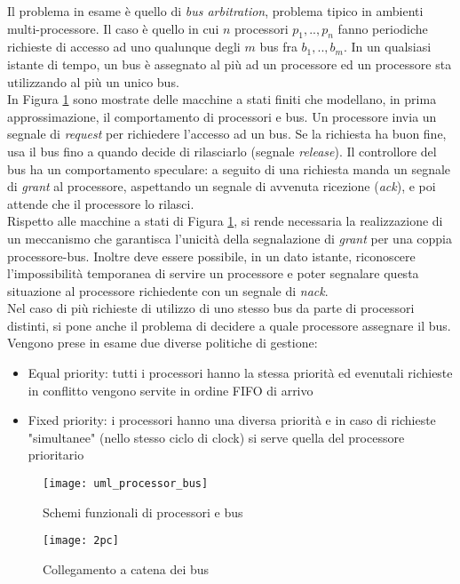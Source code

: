 Il problema in esame è quello di \textit{bus arbitration}, problema tipico in ambienti multi-processore. Il caso è quello in cui $n$ processori ${p_1,..,p_n}$  fanno periodiche richieste di accesso ad uno qualunque degli $m$ bus fra ${b_1,..,b_m}$. In un qualsiasi istante di tempo, un bus è assegnato al più ad un processore ed un processore sta utilizzando al più un unico bus.\\
In Figura \ref{Fig:uml} sono mostrate delle macchine a stati finiti che modellano, in prima approssimazione, il comportamento di processori e bus. Un processore invia un segnale di \textit{request} per richiedere l'accesso ad un bus. Se la richiesta ha buon fine, usa il bus fino a quando decide di rilasciarlo (segnale \textit{release}). Il controllore del bus ha un comportamento speculare: a seguito di una richiesta manda un segnale di \textit{grant} al processore, aspettando un segnale di avvenuta ricezione (\textit{ack}), e poi attende che il processore lo rilasci.\\
Rispetto alle macchine a stati di Figura \ref{Fig:uml}, si rende necessaria la realizzazione di un meccanismo che garantisca l’unicità della segnalazione di \textit{grant} per una coppia processore-bus. Inoltre deve essere possibile, in un dato istante, riconoscere l’impossibilità temporanea di servire un processore e poter segnalare questa situazione al processore richiedente con un segnale di \textit{nack}.\\
Nel caso di più richieste di utilizzo di uno stesso bus da parte di processori distinti, si pone anche il problema di decidere a quale processore assegnare il bus. Vengono prese in esame due diverse politiche di gestione:
\begin{itemize}
\item Equal priority:  tutti i processori hanno la stessa priorità ed evenutali richieste in conflitto vengono servite in ordine FIFO di arrivo
\item Fixed priority:  i processori hanno una diversa priorità e in caso di richieste "simultanee" (nello stesso ciclo di clock) si serve quella del processore prioritario
\end{itemize}
\begin{center}
\begin{figure}
\texttt{[image: uml\_processor\_bus]}
\caption{Schemi funzionali di processori e bus}
\label{Fig:uml}
\end{figure}
\begin{figure}
\texttt{[image: 2pc]}
\caption{Collegamento a catena dei bus}
\label{Fig:2pc}
\end{figure}
\end{center}
